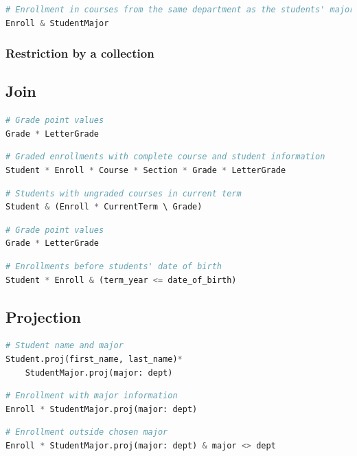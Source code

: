 \documentclass[letter,10pt]{article}
\begin{document}
\begin{lstlisting}[language=Python]
# Enrollment in courses from the same department as the students' major
Enroll & StudentMajor
\end{lstlisting}

\subsubsection{Restriction by a collection}

\subsection{Join}
\begin{lstlisting}[language=Python]
# Grade point values
Grade * LetterGrade
\end{lstlisting}
\begin{lstlisting}[language=Python]
# Graded enrollments with complete course and student information
Student * Enroll * Course * Section * Grade * LetterGrade
\end{lstlisting}
\begin{lstlisting}[language=Python]
# Students with ungraded courses in current term
Student & (Enroll * CurrentTerm \ Grade)
\end{lstlisting}
\begin{lstlisting}[language=Python]
# Grade point values
Grade * LetterGrade
\end{lstlisting}

\begin{lstlisting}[language=Python]
# Enrollments before students' date of birth
Student * Enroll & (term_year <= date_of_birth)
\end{lstlisting}

\subsection{Projection}
\begin{lstlisting}[language=Python]
# Student name and major
Student.proj(first_name, last_name)*
    StudentMajor.proj(major: dept)
\end{lstlisting}

\begin{lstlisting}[language=Python]
# Enrollment with major information
Enroll * StudentMajor.proj(major: dept)
\end{lstlisting}

\begin{lstlisting}[language=Python]
# Enrollment outside chosen major
Enroll * StudentMajor.proj(major: dept) & major <> dept
\end{lstlisting}
\end{document}
